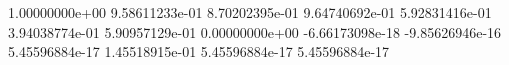  1.00000000e+00
 9.58611233e-01
 8.70202395e-01
 9.64740692e-01
 5.92831416e-01
 3.94038774e-01
 5.90957129e-01
 0.00000000e+00
 -6.66173098e-18
 -9.85626946e-16
 5.45596884e-17
 1.45518915e-01
 5.45596884e-17
 5.45596884e-17
